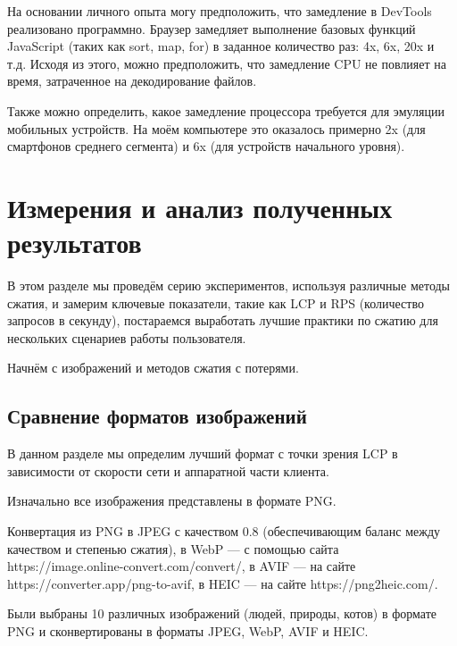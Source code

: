 \documentclass[12pt]{article}
\begin{document}
На основании личного опыта могу предположить, что замедление в DevTools реализовано программно.
Браузер замедляет выполнение базовых функций JavaScript (таких как sort, map, for)
в заданное количество раз: 4x, 6x, 20x и т.д.
Исходя из этого, можно предположить, что замедление CPU не повлияет на время,
затраченное на декодирование файлов.

Также можно определить, какое замедление процессора требуется для эмуляции мобильных устройств.
На моём компьютере это оказалось примерно 2x (для смартфонов среднего сегмента)
и 6x (для устройств начального уровня).

\section{Измерения и анализ полученных результатов}

В этом разделе мы проведём серию экспериментов, используя различные методы сжатия,
и замерим ключевые показатели, такие как LCP и RPS (количество запросов в секунду),
постараемся выработать лучшие практики по сжатию для нескольких сценариев работы пользователя.

Начнём с изображений и методов сжатия с потерями.

\subsection{Сравнение форматов изображений}

В данном разделе мы определим лучший формат с точки зрения LCP
в зависимости от скорости сети и аппаратной части клиента.

Изначально все изображения представлены в формате PNG.

Конвертация из PNG в JPEG с качеством 0.8 (обеспечивающим баланс между качеством
и степенью сжатия), в WebP — с помощью сайта https://image.online-convert.com/convert/,
в AVIF — на сайте https://converter.app/png-to-avif,
в HEIC — на сайте https://png2heic.com/.

Были выбраны 10 различных изображений (людей, природы, котов)
в формате PNG и сконвертированы в форматы JPEG, WebP, AVIF и HEIC.
\end{document}
